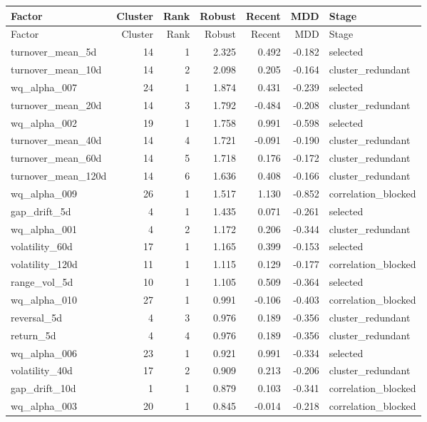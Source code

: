 \scriptsize
\setlength{\tabcolsep}{2pt}
\begin{longtable}{lrrrrrl}
\toprule
Factor & Cluster & Rank & Robust & Recent & MDD & Stage \\
\midrule
\endfirsthead
\toprule
Factor & Cluster & Rank & Robust & Recent & MDD & Stage \\
\midrule
\endhead
turnover\_mean\_5d & 14 & 1 & 2.325 & 0.492 & -0.182 & selected \\
turnover\_mean\_10d & 14 & 2 & 2.098 & 0.205 & -0.164 & cluster\_redundant \\
wq\_alpha\_007 & 24 & 1 & 1.874 & 0.431 & -0.239 & selected \\
turnover\_mean\_20d & 14 & 3 & 1.792 & -0.484 & -0.208 & cluster\_redundant \\
wq\_alpha\_002 & 19 & 1 & 1.758 & 0.991 & -0.598 & selected \\
turnover\_mean\_40d & 14 & 4 & 1.721 & -0.091 & -0.190 & cluster\_redundant \\
turnover\_mean\_60d & 14 & 5 & 1.718 & 0.176 & -0.172 & cluster\_redundant \\
turnover\_mean\_120d & 14 & 6 & 1.636 & 0.408 & -0.166 & cluster\_redundant \\
wq\_alpha\_009 & 26 & 1 & 1.517 & 1.130 & -0.852 & correlation\_blocked \\
gap\_drift\_5d & 4 & 1 & 1.435 & 0.071 & -0.261 & selected \\
wq\_alpha\_001 & 4 & 2 & 1.172 & 0.206 & -0.344 & cluster\_redundant \\
volatility\_60d & 17 & 1 & 1.165 & 0.399 & -0.153 & selected \\
volatility\_120d & 11 & 1 & 1.115 & 0.129 & -0.177 & correlation\_blocked \\
range\_vol\_5d & 10 & 1 & 1.105 & 0.509 & -0.364 & selected \\
wq\_alpha\_010 & 27 & 1 & 0.991 & -0.106 & -0.403 & correlation\_blocked \\
reversal\_5d & 4 & 3 & 0.976 & 0.189 & -0.356 & cluster\_redundant \\
return\_5d & 4 & 4 & 0.976 & 0.189 & -0.356 & cluster\_redundant \\
wq\_alpha\_006 & 23 & 1 & 0.921 & 0.991 & -0.334 & selected \\
volatility\_40d & 17 & 2 & 0.909 & 0.213 & -0.206 & cluster\_redundant \\
gap\_drift\_10d & 1 & 1 & 0.879 & 0.103 & -0.341 & correlation\_blocked \\
wq\_alpha\_003 & 20 & 1 & 0.845 & -0.014 & -0.218 & correlation\_blocked \\

\end{longtable}
